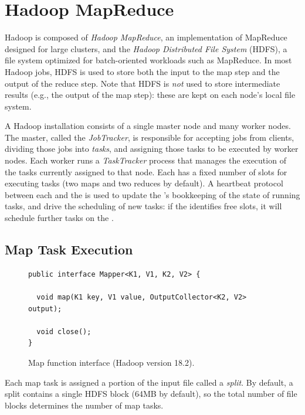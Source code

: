 \section{Hadoop MapReduce}
\label{ch:hadoop:sec:hadoop}

Hadoop is composed of \emph{Hadoop MapReduce}, an implementation of MapReduce
designed for large clusters, and the \emph{Hadoop Distributed File System}
(HDFS), a file system optimized for batch-oriented workloads such as MapReduce.
In most Hadoop jobs, HDFS is used to store both the input to the map step and
the output of the reduce step.  Note that HDFS is \emph{not} used to store
intermediate results (e.g., the output of the map step): these are kept on each
node's local file system.

A Hadoop installation consists of a single master node and many worker nodes.
The master, called the \emph{JobTracker}, is responsible for accepting jobs
from clients, dividing those jobs into \emph{tasks}, and assigning those tasks
to be executed by worker nodes.  Each worker runs a \emph{TaskTracker} process
that manages the execution of the tasks currently assigned to that node.  Each
{\TT} has a fixed number of slots for executing tasks (two maps and two reduces
by default).  A heartbeat protocol between each {\TT} and the {\JT} is used to
update the {\JT}'s bookkeeping of the state of running tasks, and drive the
scheduling of new tasks: if the \JT identifies free {\TT} slots, it will
schedule further tasks on the {\TT}.

\subsection{Map Task Execution}
\label{ch:hadoop:sec:maptask}

\begin{figure}[t]
\ssp
\begin{minipage}{\linewidth}
\centering
\begin{verbatim}
public interface Mapper<K1, V1, K2, V2> {
  
  void map(K1 key, V1 value, OutputCollector<K2, V2> output);

  void close();
}
\end{verbatim}
\end{minipage}
\caption{Map function interface (Hadoop version 18.2).}
\label{fig:mapfunction}
\end{figure}

Each map task is assigned a portion of the input file called a \emph{split}.
By default, a split contains a single HDFS block (64MB by default), so the
total number of file blocks determines the number of map tasks.

